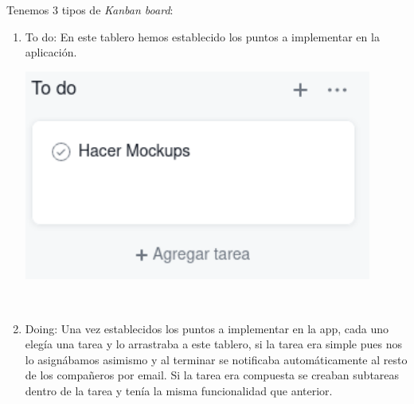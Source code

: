 \documentclass[12pt,a4paper]{article}
\begin{document}
\begin{minipage}{.75\textwidth}
Tenemos 3 tipos de \textit{Kanban board}:
\begin{enumerate}
\item To do: En este tablero hemos establecido los puntos a implementar en la aplicación.\\

\begin{minipage}{.50\textwidth}
  \includegraphics[width=0.9\textwidth, right]{todo}
\end{minipage}\\


\item Doing: Una vez establecidos los puntos a implementar en la app, cada uno elegía una tarea y lo arrastraba a este tablero, si la tarea era simple pues nos lo asignábamos asimismo y al terminar se notificaba automáticamente al resto de los compañeros por email. Si la tarea era compuesta se creaban subtareas dentro de la tarea y tenía la misma funcionalidad que anterior.


\end{enumerate}
\end{minipage}
\end{document}
